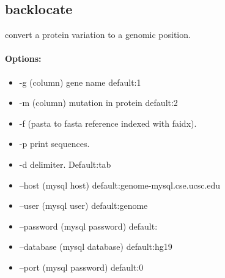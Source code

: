 \documentclass[12pt]{article}
\begin{document}
\subsection{backlocate}
convert a protein variation to a genomic position.
\paragraph{Options:}
\begin{itemize}
\item-g (column) gene name default:1
\item-m (column) mutation in protein default:2
\item-f (pasta to fasta reference indexed with faidx).
\item-p print sequences.
\item-d delimiter. Default:tab
\item--host (mysql host) default:genome-mysql.cse.ucsc.edu
\item--user (mysql user) default:genome
\item--password (mysql password) default:
\item--database (mysql database) default:hg19
\item--port (mysql password) default:0
\end{itemize}
\end{document}
